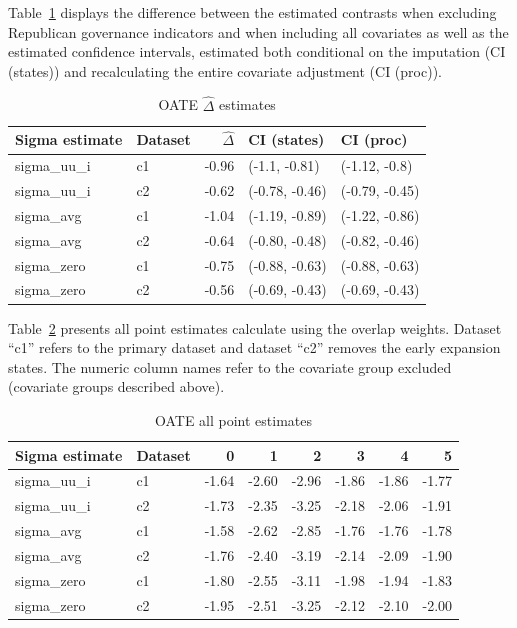\documentclass[12pt]{article}
\begin{document}
Table~\ref{tab:oaterepubdiff} displays the difference between the estimated contrasts when excluding Republican governance indicators and when including all covariates as well as the estimated confidence intervals, estimated both conditional on the imputation (CI (states)) and recalculating the entire covariate adjustment (CI (proc)).

\begin{table}[ht]
\centering
\begin{tabular}{llrll}
  \toprule
Sigma estimate & Dataset & $\hat{\Delta}$ & CI (states) & CI (proc) \\ 
  \midrule
sigma\_uu\_i & c1 & -0.96 & (-1.1, -0.81) & (-1.12, -0.8) \\ 
  sigma\_uu\_i & c2 & -0.62 & (-0.78, -0.46) & (-0.79, -0.45) \\ 
  sigma\_avg & c1 & -1.04 & (-1.19, -0.89) & (-1.22, -0.86) \\ 
  sigma\_avg & c2 & -0.64 & (-0.80, -0.48) & (-0.82, -0.46) \\ 
  sigma\_zero & c1 & -0.75 & (-0.88, -0.63) & (-0.88, -0.63) \\ 
  sigma\_zero & c2 & -0.56 & (-0.69, -0.43) & (-0.69, -0.43) \\ 
   \bottomrule
\end{tabular}
\caption{OATE $\hat{\Delta}$ estimates}
\label{tab:oaterepubdiff}
\end{table}

Table~\ref{tab:oatesensitive} presents all point estimates calculate using the overlap weights. Dataset ``c1'' refers to the primary dataset and dataset ``c2'' removes the early expansion states. The numeric column names refer to the covariate group excluded (covariate groups described above).

\begin{table}[ht]
\centering
\begin{tabular}{llrrrrrr}
  \toprule
Sigma estimate & Dataset & 0 & 1 & 2 & 3 & 4 & 5 \\ 
  \midrule
sigma\_uu\_i & c1 & -1.64 & -2.60 & -2.96 & -1.86 & -1.86 & -1.77 \\ 
  sigma\_uu\_i & c2 & -1.73 & -2.35 & -3.25 & -2.18 & -2.06 & -1.91 \\ 
  sigma\_avg & c1 & -1.58 & -2.62 & -2.85 & -1.76 & -1.76 & -1.78 \\ 
  sigma\_avg & c2 & -1.76 & -2.40 & -3.19 & -2.14 & -2.09 & -1.90 \\ 
  sigma\_zero & c1 & -1.80 & -2.55 & -3.11 & -1.98 & -1.94 & -1.83 \\ 
  sigma\_zero & c2 & -1.95 & -2.51 & -3.25 & -2.12 & -2.10 & -2.00 \\ 
   \bottomrule
\end{tabular}
\caption{OATE all point estimates}
\label{tab:oatesensitive}
\end{table}
\end{document}
